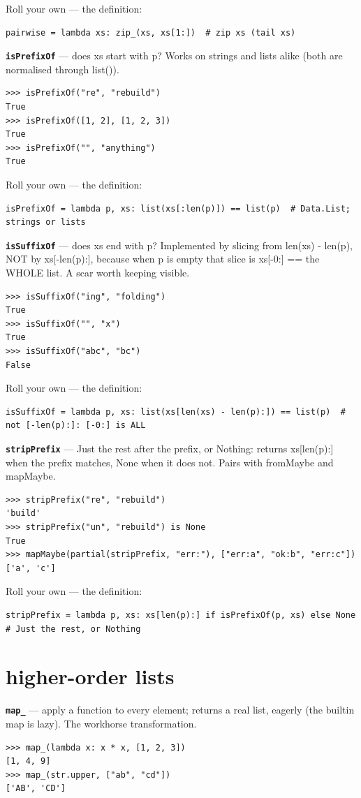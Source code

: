 \documentclass[10pt,letterpaper]{article}
\begin{document}
Roll your own --- the definition:

\begin{lstlisting}[style=ex]
pairwise = lambda xs: zip_(xs, xs[1:])  # zip xs (tail xs)
\end{lstlisting}
\textbf{\texttt{isPrefixOf}} --- does xs start with p? Works on strings and lists alike (both are normalised through list()).
\begin{lstlisting}[style=ex]
>>> isPrefixOf("re", "rebuild")
True
>>> isPrefixOf([1, 2], [1, 2, 3])
True
>>> isPrefixOf("", "anything")
True
\end{lstlisting}

Roll your own --- the definition:

\begin{lstlisting}[style=ex]
isPrefixOf = lambda p, xs: list(xs[:len(p)]) == list(p)  # Data.List; strings or lists
\end{lstlisting}
\textbf{\texttt{isSuffixOf}} --- does xs end with p? Implemented by slicing from len(xs) - len(p), NOT by xs[-len(p):], because when p is empty that slice is xs[-0:] == the WHOLE list. A scar worth keeping visible.
\begin{lstlisting}[style=ex]
>>> isSuffixOf("ing", "folding")
True
>>> isSuffixOf("", "x")
True
>>> isSuffixOf("abc", "bc")
False
\end{lstlisting}

Roll your own --- the definition:

\begin{lstlisting}[style=ex]
isSuffixOf = lambda p, xs: list(xs[len(xs) - len(p):]) == list(p)  # not [-len(p):]: [-0:] is ALL
\end{lstlisting}
\textbf{\texttt{stripPrefix}} --- Just the rest after the prefix, or Nothing: returns xs[len(p):] when the prefix matches, None when it does not. Pairs with fromMaybe and mapMaybe.
\begin{lstlisting}[style=ex]
>>> stripPrefix("re", "rebuild")
'build'
>>> stripPrefix("un", "rebuild") is None
True
>>> mapMaybe(partial(stripPrefix, "err:"), ["err:a", "ok:b", "err:c"])
['a', 'c']
\end{lstlisting}

Roll your own --- the definition:

\begin{lstlisting}[style=ex]
stripPrefix = lambda p, xs: xs[len(p):] if isPrefixOf(p, xs) else None  # Just the rest, or Nothing
\end{lstlisting}

\section{higher-order lists}
\textbf{\texttt{map\_}} --- apply a function to every element; returns a real list, eagerly (the builtin map is lazy). The workhorse transformation.
\begin{lstlisting}[style=ex]
>>> map_(lambda x: x * x, [1, 2, 3])
[1, 4, 9]
>>> map_(str.upper, ["ab", "cd"])
['AB', 'CD']
\end{lstlisting}
\end{document}
